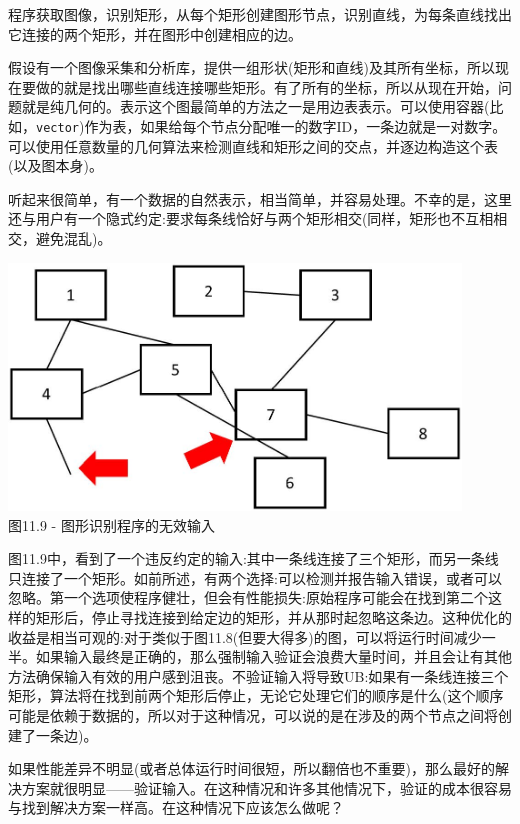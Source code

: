 程序获取图像，识别矩形，从每个矩形创建图形节点，识别直线，为每条直线找出它连接的两个矩形，并在图形中创建相应的边。

假设有一个图像采集和分析库，提供一组形状(矩形和直线)及其所有坐标，所以现在要做的就是找出哪些直线连接哪些矩形。有了所有的坐标，所以从现在开始，问题就是纯几何的。表示这个图最简单的方法之一是用边表表示。可以使用容器(比如，\texttt{vector})作为表，如果给每个节点分配唯一的数字ID，一条边就是一对数字。可以使用任意数量的几何算法来检测直线和矩形之间的交点，并逐边构造这个表(以及图本身)。

听起来很简单，有一个数据的自然表示，相当简单，并容易处理。不幸的是，这里还与用户有一个隐式约定:要求每条线恰好与两个矩形相交(同样，矩形也不互相相交，避免混乱)。 

\begin{center}
\includegraphics[width=0.9\textwidth]{content/3/chapter11/images/9.jpg}\\
图11.9 - 图形识别程序的无效输入
\end{center}

图11.9中，看到了一个违反约定的输入:其中一条线连接了三个矩形，而另一条线只连接了一个矩形。如前所述，有两个选择:可以检测并报告输入错误，或者可以忽略。第一个选项使程序健壮，但会有性能损失:原始程序可能会在找到第二个这样的矩形后，停止寻找连接到给定边的矩形，并从那时起忽略这条边。这种优化的收益是相当可观的:对于类似于图11.8(但要大得多)的图，可以将运行时间减少一半。如果输入最终是正确的，那么强制输入验证会浪费大量时间，并且会让有其他方法确保输入有效的用户感到沮丧。不验证输入将导致UB:如果有一条线连接三个矩形，算法将在找到前两个矩形后停止，无论它处理它们的顺序是什么(这个顺序可能是依赖于数据的，所以对于这种情况，可以说的是在涉及的两个节点之间将创建了一条边)。

如果性能差异不明显(或者总体运行时间很短，所以翻倍也不重要)，那么最好的解决方案就很明显——验证输入。在这种情况和许多其他情况下，验证的成本很容易与找到解决方案一样高。在这种情况下应该怎么做呢？

